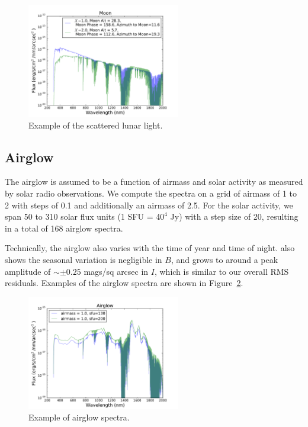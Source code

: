 \documentclass[]{spie}
\begin{document}
\begin{figure}[ht]
  \begin{center}
  \includegraphics[height=5cm]{plots/moon.pdf}
  \end{center}
  \caption{Example of the scattered lunar light. \label{fig:moon}}
\end{figure}


\subsection{Airglow}

The airglow is assumed to be a function of airmass and solar activity as measured by solar radio observations.  We compute the spectra on a grid of airmass of 1 to 2 with steps of 0.1 and additionally an airmass of 2.5.  For the solar activity, we span 50 to 310 solar flux units (1 SFU = 4$0^4$ Jy) with a step size of 20, resulting in a total of 168 airglow spectra. 

Technically, the airglow also varies with the time of year and time of night.  also shows the seasonal variation is negligible in $B$, and grows to around a peak amplitude of $\sim\pm0.25$ mags/sq arcsec in $I$, which is similar to our overall RMS residuals. Examples of the airglow spectra are shown in Figure~\ref{fig:airglow}. 

\begin{figure}[ht]
\begin{center}
  \includegraphics[height=5cm]{plots/airglow.pdf}
  \end{center}
  \caption{Example of airglow spectra. \label{fig:airglow}}
\end{figure}
\end{document}
